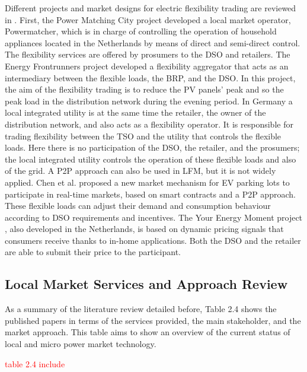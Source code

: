 Different projects and market designs for electric flexibility trading are reviewed in \cite{eid2016market}. First, the Power Matching City project developed a local market operator, Powermatcher, which is in charge of controlling the operation of household appliances located in the Netherlands by means of direct and semi-direct control. 
The flexibility services are offered by prosumers to the DSO and retailers. The Energy Frontrunners project developed a flexibility aggregator that acts as an intermediary between the flexible loads, the BRP, and the DSO. In this project, the aim of the flexibility trading is to reduce the PV panels' peak and so the peak load in the distribution network during the evening period. In Germany a local integrated utility is at the same time the retailer, the owner of the distribution network, and also acts as a flexibility operator. It is responsible for trading flexibility between the TSO and the utility that controls the flexible loads. Here there is no participation of the DSO, the retailer, and the prosumers; the local integrated utility controls the operation of these flexible
loads and also of the grid.
A P2P approach can also be used in LFM, but it is not widely applied. Chen et al. \cite{chen2017integrated} proposed a new market mechanism for EV parking lots to participate in real-time markets, based on smart contracts and a P2P approach. These flexible loads can adjust their demand and consumption behaviour according to DSO requirements and incentives. The Your Energy Moment project \cite{eid2016market}, also developed in the Netherlands, is based on dynamic pricing signals that consumers receive thanks to in-home applications. Both the DSO and
the retailer are able to submit their price to the participant.

\subsection{Local Market Services and Approach Review}
As a summary of the literature review detailed before, Table 2.4 shows the published papers in terms of the services provided, the main stakeholder, and the market approach. This table aims to show an overview of the current status of local and micro power market technology.

\textcolor{red}{table 2.4 include}

